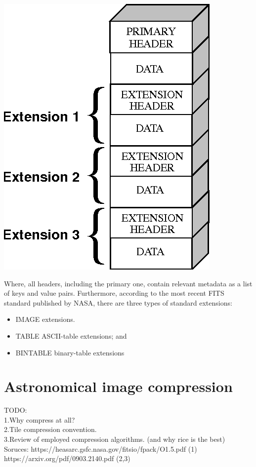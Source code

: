 \documentclass[licencjacka,en]{pracamgr}
\begin{document}
\centerline{\includegraphics[scale=0.3]{fits}}

\hfill \break

Where, all headers, including the primary one, contain relevant metadata as a list of keys and value pairs.
Furthermore, according to the most recent FITS standard published by NASA, there are three types of standard extensions:
\begin{itemize}
	\item IMAGE extensions.
	\item TABLE ASCII-table extensions; and
	\item BINTABLE binary-table extensions
\end{itemize}

\section{Astronomical image compression}
TODO:\\
1.Why compress at all? \\
2.Tile compression convention.\\
3.Review of employed compression algorithms. (and why rice is the best) \\

Soruces:
https://heasarc.gsfc.nasa.gov/fitsio/fpack/O1.5.pdf  (1)
https://arxiv.org/pdf/0903.2140.pdf
(2,3)
\end{document}

